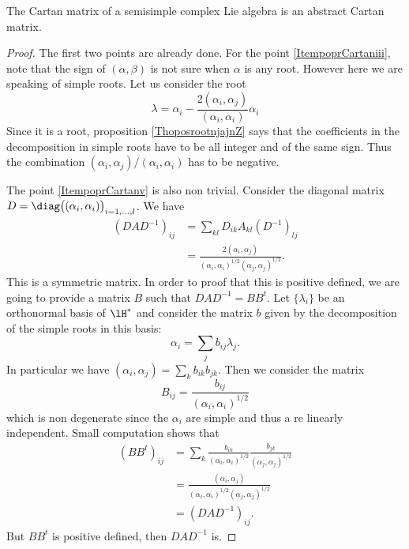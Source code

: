 \begin{proposition}
    The Cartan matrix of a semisimple complex Lie algebra is an abstract Cartan matrix.
\end{proposition}

\begin{proof}
    The first two points are already done. For the point \ref{ItempoprCartaniii}, note that the sign of \( (\alpha,\beta)\) is not sure when \( \alpha\) is any root. However here we are speaking of simple roots. Let us consider the root
    \begin{equation}
        \lambda=\alpha_i-\frac{ 2(\alpha_i,\alpha_j) }{ (\alpha_i,\alpha_i) }\alpha_i
    \end{equation}
    Since it is a root, proposition \ref{ThoposrootnjajnZ} says that the coefficients in the decomposition in simple roots have to be all integer and of the same sign. Thus the combination \( (\alpha_i,\alpha_j)/(\alpha_i,\alpha_i)\) has to be negative.

    The point \ref{ItempoprCartanv} is also non trivial. Consider the diagonal matrix \( D=\diag\big( (\alpha_i,\alpha_i) \big)_{i=1,\ldots,l}\). We have
    \begin{subequations}
        \begin{align}
            (DAD^{-1})_{ij}&=\sum_{kl}D_{ik}A_{kl}(D^{-1})_{lj}\\
            &=\frac{ 2(\alpha_i,\alpha_j) }{ (\alpha_i,\alpha_i)^{1/2}(\alpha_j,\alpha_j)^{1/2} }.
        \end{align}
    \end{subequations}
    This is a symmetric matrix. In order to proof that this is positive defined, we are going to provide a matrix \( B\) such that \( DAD^{-1}=BB^t\). Let \( \{ \lambda_i \}\) be an orthonormal basis of \( \lH^*\) and consider the matrix \( b\) given by the decomposition of the simple roots in this basis:
    \begin{equation}
        \alpha_i=\sum_j b_{ij}\lambda_j.
    \end{equation}
    In particular we have \( (\alpha_i,\alpha_j)=\sum_kb_{ik}b_{jk}\). Then we consider the matrix
    \begin{equation}
        B_{ij}=\frac{ b_{ij} }{ (\alpha_i,\alpha_i)^{1/2} }
    \end{equation}
    which is non degenerate since the \( \alpha_i\) are simple and thus a re linearly independent. Small computation shows that 
    \begin{subequations}
        \begin{align}
            (BB^t)_{ij}&=\sum_k\frac{ b_{ik} }{ (\alpha_i,\alpha_i)^{1/2} }\frac{ b_{jk} }{ (\alpha_j,\alpha_j)^{1/2} }\\
            &=\frac{ (\alpha_i,\alpha_j) }{ (\alpha_i,\alpha_i)^{1/2}(\alpha_j,\alpha_j)^{1/2} }\\
            &=(DAD^{-1})_{ij}.
        \end{align}
    \end{subequations}
    But \( BB^t\) is positive defined, then \( DAD^{-1}\) is.
\end{proof}


